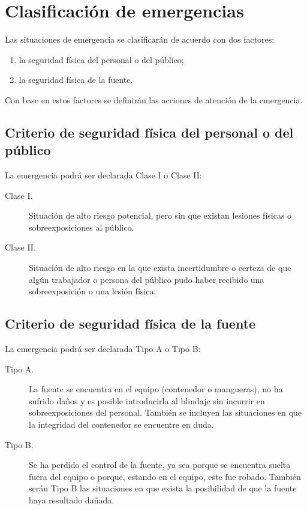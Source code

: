 \section{Clasificación de emergencias}

Las situaciones de emergencia se clasificarán de acuerdo con dos factores:
\begin{enumerate}
  \item la seguridad física del personal o del público;
  \item la seguridad física de la fuente.
\end{enumerate}

Con base en estos factores se definirán las acciones de atención de la emergencia.

\subsection{Criterio de seguridad física del personal o del público}

La emergencia podrá ser declarada Clase I o Clase II:
\begin{description}
  \item[Clase I.] Situación de alto riesgo potencial, pero sin que existan lesiones físicas o sobreexposiciones al público.
  \item[Clase II.] Situación de alto riesgo en la que exista incertidumbre o certeza de que algún trabajador o persona del público pudo haber recibido una sobreexposición o una lesión física.
\end{description}

\subsection{Criterio de seguridad física de la fuente}

La emergencia podrá ser declarada Tipo A o Tipo B:
\begin{description}
  \item[Tipo A.] La fuente se encuentra en el equipo (contenedor o mangueras), no ha sufrido daños y es posible introducirla al blindaje sin incurrir en sobreexposiciones del personal. También se incluyen las situaciones en que la integridad del contenedor se encuentre en duda.
  \item[Tipo B.] Se ha perdido el control de la fuente, ya sea porque se encuentra suelta fuera del equipo o porque, estando en el equipo, este fue robado. También serán Tipo B las situaciones en que exista la posibilidad de que la fuente haya resultado dañada.
\end{description}

